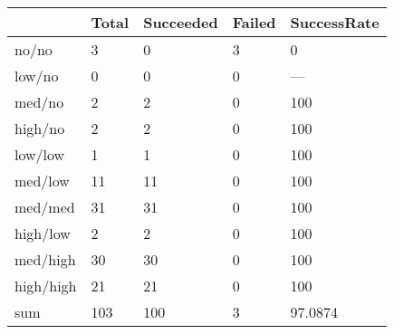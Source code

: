 \begin{tabular}{lllll}
& Total & Succeeded & Failed & SuccessRate \\ 
\hline 
no/no & 3 & 0 & 3 & 0 \\ 
low/no & 0 & 0 & 0 & --- \\ 
med/no & 2 & 2 & 0 & 100 \\ 
high/no & 2 & 2 & 0 & 100 \\ 
low/low & 1 & 1 & 0 & 100 \\ 
med/low & 11 & 11 & 0 & 100 \\ 
med/med & 31 & 31 & 0 & 100 \\ 
high/low & 2 & 2 & 0 & 100 \\ 
med/high & 30 & 30 & 0 & 100 \\ 
high/high & 21 & 21 & 0 & 100 \\ 
sum & 103 & 100 & 3 & 97.0874 \\ 
\hline 
\end{tabular}